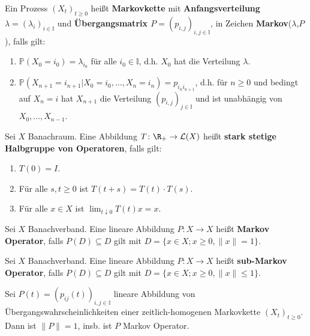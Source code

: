 \begin{defi}[Markovkette]
  Ein  Prozess $(X_t)_{t\geq0}$ heißt   \textbf{Markovkette} mit \textbf{Anfangsverteilung $\lambda=(\lambda_i)_{i\in\mathbb I}$} und \textbf{Übergangsmatrix $P=(p_{i,j})_{i,j\in\mathbb I}$}, in Zeichen \textbf{Markov}($\lambda$,$P$), falls gilt:
  \begin{enumerate}
      \item $\mathbb P(X_0=i_0)=\lambda_{i_0}$ für alle $i_0\in\mathbb I$, d.h. $X_0$ hat die Verteilung $\lambda$.
      \item $\mathbb P(X_{n+1}=i_{n+1}|X_0=i_0,\dots,X_n=i_n)=p_{i_n i_{n+1}}$, d.h. für $n\geq0$ und bedingt auf $X_n=i$ hat $X_{n+1}$ die Verteilung $(p_{i,j})_{j\in\mathbb I}$ und ist unabhängig von $X_0,\dots,X_{n-1}$.
  \end{enumerate}
\end{defi}



\begin{defi}
  Sei $X$ Banachraum. Eine Abbildung $T\colon \R_+\to \mathcal L(X)$ heißt \textbf{stark stetige Halbgruppe von Operatoren}, falls gilt:
  \begin{enumerate}
      \item $T(0)=I$.
      \item Für alle $s,t\geq0$ ist $T(t+s)=T(t)\cdot T(s)$.
      \item Für alle $x\in X$ ist $\lim_{t\downarrow 0}T(t)x=x$.
  \end{enumerate}
\end{defi}



\begin{defi}
Sei $X$ Banachverband. Eine lineare Abbildung $P\colon X\to X$ heißt   \textbf{Markov Operator}, falls $P(D)\subseteq D$ gilt mit $D=\{x\in X;x\geq 0, \|x\|=1\}$.
\end{defi}

\begin{defi}
Sei $X$ Banachverband. Eine lineare Abbildung $P\colon X\to X$ heißt   \textbf{sub-Markov Operator}, falls $P(D)\subseteq D$ gilt mit $D=\{x\in X; x\geq0, \|x\|\leq1\}$. 
\end{defi}

\begin{prop}
  Sei $P(t)=(p_{ij}(t))_{i,j\in\mathbb I}$ lineare Abbildung von Übergangswahrscheinlichkeiten einer zeitlich-homogenen Markovkette $(X_t)_{t\geq0}$. Dann ist $\|P\|=1$, insb. ist $P$ Markov Operator. 
\end{prop}

